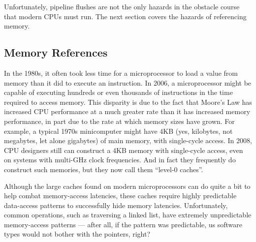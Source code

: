 Unfortunately, pipeline flushes are not the only hazards in the obstacle
course that modern CPUs must run.
The next section covers the hazards of referencing memory.

\subsection{Memory References}
\label{sec:cpu:Memory References}

In the 1980s, it often took less time for a microprocessor to load a value
from memory than it did to execute an instruction.
In 2006, a microprocessor might be capable of executing hundreds or even
thousands of instructions in the time required to access memory.
This disparity is due to the fact that Moore's Law has increased CPU
performance at a much greater rate than it has increased memory
performance, in part due to the rate at which memory sizes have
grown.
For example, a typical 1970s minicomputer might have 4KB (yes, kilobytes,
not megabytes, let alone gigabytes) of main memory, with single-cycle access.
In 2008, CPU designers still can construct a 4KB memory with single-cycle
access, even on systems with multi-GHz clock frequencies.
And in fact they frequently do construct such memories, but they now
call them ``level-0 caches''.

Although the large caches found on modern microprocessors can do quite
a bit to help combat memory-access latencies,
these caches require highly predictable data-access patterns to
successfully hide memory latencies.
Unfortunately, common operations, such as traversing a linked list,
have extremely unpredictable memory-access patterns --- after all,
if the pattern was predictable, us software types would not bother
with the pointers, right?

